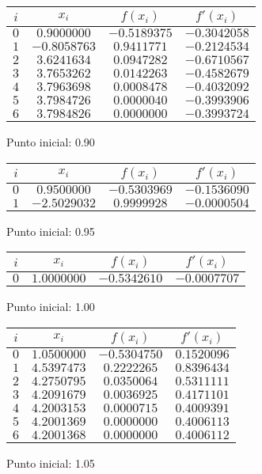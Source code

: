 \begin{figure}[H]
	\centering
	\caption{Punto inicial: 0.90}
	\begin{tabular}{|c|c|c|c|} \hline
		$i$ & $x_{i}$ & $f(x_{i})$ & $f'(x_{i})$ \\ \hline
		$0$ & $0.9000000$ & $-0.5189375$ & $-0.3042058$ \\ \hline
		$1$ & $-0.8058763$ & $0.9411771$ & $-0.2124534$ \\ \hline
		$2$ & $3.6241634$ & $0.0947282$ & $-0.6710567$ \\ \hline
		$3$ & $3.7653262$ & $0.0142263$ & $-0.4582679$ \\ \hline
		$4$ & $3.7963698$ & $0.0008478$ & $-0.4032092$ \\ \hline
		$5$ & $3.7984726$ & $0.0000040$ & $-0.3993906$ \\ \hline
		$6$ & $3.7984826$ & $0.0000000$ & $-0.3993724$ \\ \hline
	\end{tabular}
\end{figure}
\begin{figure}[H]
	\centering
	\caption{Punto inicial: 0.95}
	\begin{tabular}{|c|c|c|c|} \hline
		$i$ & $x_{i}$ & $f(x_{i})$ & $f'(x_{i})$ \\ \hline
		$0$ & $0.9500000$ & $-0.5303969$ & $-0.1536090$ \\ \hline
		$1$ & $-2.5029032$ & $0.9999928$ & $-0.0000504$ \\ \hline
	\end{tabular}
\end{figure}
\begin{figure}[H]
	\centering
	\caption{Punto inicial: 1.00}
	\begin{tabular}{|c|c|c|c|} \hline
		$i$ & $x_{i}$ & $f(x_{i})$ & $f'(x_{i})$ \\ \hline
		$0$ & $1.0000000$ & $-0.5342610$ & $-0.0007707$ \\ \hline
	\end{tabular}
\end{figure}
\begin{figure}[H]
	\centering
	\caption{Punto inicial: 1.05}
	\begin{tabular}{|c|c|c|c|} \hline
		$i$ & $x_{i}$ & $f(x_{i})$ & $f'(x_{i})$ \\ \hline
		$0$ & $1.0500000$ & $-0.5304750$ & $0.1520096$ \\ \hline
		$1$ & $4.5397473$ & $0.2222265$ & $0.8396434$ \\ \hline
		$2$ & $4.2750795$ & $0.0350064$ & $0.5311111$ \\ \hline
		$3$ & $4.2091679$ & $0.0036925$ & $0.4171101$ \\ \hline
		$4$ & $4.2003153$ & $0.0000715$ & $0.4009391$ \\ \hline
		$5$ & $4.2001369$ & $0.0000000$ & $0.4006113$ \\ \hline
		$6$ & $4.2001368$ & $0.0000000$ & $0.4006112$ \\ \hline
	\end{tabular}
\end{figure}
